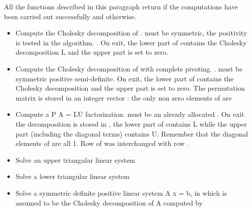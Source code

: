 All the functions described in this paragraph return  if the
computations have been carried out successfully and  otherwise.

\begin{itemize}
\item {}
  \sshortdescribe Compute the Cholesky decomposition of .  must
  be symmetric, the positivity is tested in the algorithm.  .
  On exit, the lower part of  contains the Cholesky decomposition L and
  the upper part is set to zero. 

\item {}
    \sshortdescribe Compute the
    Cholesky decomposition of  with complete pivoting. 
    .
     must be
    symmetric positive semi-definite. On exit, the lower part of 
    contains the Cholesky decomposition  and the upper part is set to zero. The
    permutation matrix is stored in an integer vector  : the only non
    zero elements of  are 

\item {} 
  \sshortdescribe Compute a P A = LU factorization.  must be an
  already allocated  \PnlPermutation. On exit the decomposition is
  stored in , the lower part of  contains L while the upper part
  (including the diagonal terms) contains U. Remember that the diagonal
  elements of  are all 1. Row  of  was interchanged with
  row .
  
\item {}
  \sshortdescribe Solve an upper triangular linear system 

\item {}
  \sshortdescribe Solve a lower triangular linear system  
  
\item {} 
  \sshortdescribe Solve a symmetric definite positive linear system A x = b, 
  in which  is assumed to be the Cholesky decomposition of A
  computed by 


\end{itemize}
